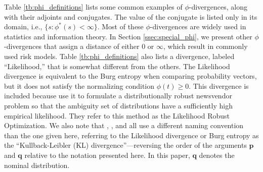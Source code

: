 \documentclass[opre,nonblindrev]{informs3} %
\newcommand{\q}{\mathbf{q}}
\newcommand{\p}{\mathbf{p}}
\begin{document}
Table \ref{tb:phi_definitions} lists some common examples of $\phi$-divergences, along with their adjoints and conjugates.
The value of the conjugate is listed only in its domain, i.e., $\{s : \phi^*(s) < \infty\}$.
Most of these $\phi$-divergences are widely used in statistics and information theory.
In Section \ref{ssec:special_phi}, we present other $\phi$-divergences that assign a distance of either $0$ or $\infty$, which result in commonly used risk models.
Table \ref{tb:phi_definitions} also lists a divergence, labeled ``Likelihood,'' that is somewhat different from the others.
The Likelihood divergence is equivalent to the Burg entropy when comparing probability vectors, but it does not satisfy the normalizing condition $\phi(t) \geq 0$.
This divergence is included because \citet{wang2010likelihood} use it to formulate a distributionally robust newsvendor problem so that the ambiguity set of distributions have a sufficiently high empirical likelihood. 
They refer to this method as the Likelihood Robust Optimization. 
We also note that \citep{calafiore2007ambiguous}, \citep{hukullback}, and \citep{wang2010likelihood} all use a different naming convention than the one given here, referring to the Likelihood divergence or Burg entropy as the ``Kullback-Leibler (KL) divergence''---reversing the order of the arguments $\p$ and $\q$ relative to the notation presented here.
In this paper, $\q$ denotes the  nominal distribution.
\end{document}
